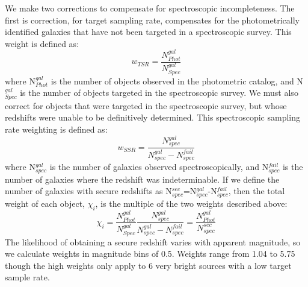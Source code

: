 \documentclass[manuscript]{aastex61}
\begin{document}
We make two corrections to compensate for spectroscopic incompleteness. The first is correction, for target sampling rate, compensates for the photometrically identified galaxies that have not been targeted in a spectroscopic survey. This weight is defined as:
\begin{equation}
w_{TSR}=\frac{N^{gal}_{Phot}}{N^{gal}_{Spec}}
\label{eq:equation 12}
\end{equation}
where N$^{gal}_{Phot}$ is the number of objects observed in the photometric catalog, and N$^{gal}_{Spec}$ is the number of objects targeted in the spectroscopic survey. We must also correct for objects that were targeted in the spectroscopic survey, but whose redshifts were unable to be definitively determined. This spectroscopic sampling rate weighting is defined as:
\begin{equation}
w_{SSR}=\frac{N^{gal}_{spec}}{N^{gal}_{spec}-N^{fail}_{spec}}
\label{eq:equation 13}
\end{equation}
where N$^{gal}_{spec}$ is the number of galaxies observed spectroscopically, and N$^{fail}_{spec}$ is the number of galaxies where the redshift was indeterminable. If we define the number of galaxies with secure redshifts as N$^{sec}_{spec}$=N$^{gal}_{spec}$-N$^{fail}_{spec}$, then the total weight of each object, $\chi_{i}$, is the multiple of the two weights described above:
\begin{equation}
\chi_{i}=\frac{N^{gal}_{Phot}}{N^{gal}_{Spec}}\frac{N^{gal}_{spec}}{N^{gal}_{spec}-N^{fail}_{spec}}=\frac{N^{gal}_{Phot}}{N^{sec}_{spec}}
\label{eq:equation 14}
\end{equation}
The likelihood of obtaining a secure redshift varies with apparent magnitude, so we calculate weights in magnitude bins of 0.5. Weights range from 1.04 to 5.75 though the high weights only apply to 6 very bright sources with a low target sample rate.
\end{document}
